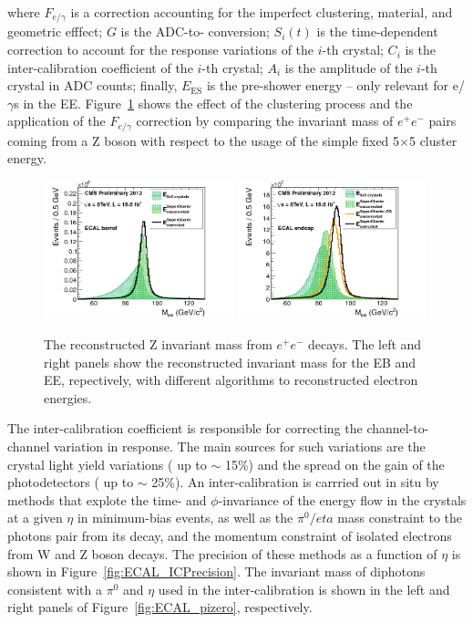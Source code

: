 where $F_{e/\gamma}$ is a correction accounting for the imperfect
clustering, material, and geometric efffect; $G$ is the ADC-to-\GeV
conversion; $S_{i}(t)$ is the time-dependent correction to account for
the response variations of the $i$-th crystal; $C_{i}$ is the
inter-calibration coefficient of the $i$-th crystal; $A_{i}$ is the
amplitude of the $i$-th crystal in ADC counts; finally,
$E_{\mathrm{ES}}$ is the pre-shower energy -- only relevant for
e/$\gamma$s in the EE. Figure~\ref{fig:ECAL_clusterE} shows the effect
of the clustering process and the application of the $F_{e/\gamma}$
correction by comparing the invariant mass of $e^{+}e^{-}$ pairs
coming from a Z boson with respect to the usage of the simple fixed
5$\times$5 cluster energy.

\begin{figure}
 \centering
\includegraphics[width=0.49\textwidth]{CMS_DetectorFigures/E_corr-EB.png}
\includegraphics[width=0.49\textwidth]{CMS_DetectorFigures/E_corr-EE.png}
\caption{The reconstructed Z invariant mass from $e^{+}e^{-}$
  decays. The left and right panels show the reconstructed invariant mass for
  the EB and EE, repectively, with different algorithms to reconstructed electron energies.\label{fig:ECAL_clusterE}}
\end{figure}

The inter-calibration coefficient is responsible for correcting the
channel-to-channel variation in response. The main sources for such
variations are the crystal light yield variations ( up to $\sim$ 15\%)
and the spread on the gain of the photodetectors ( up to $\sim$
25\%). An inter-calibration is carrried out in situ by methods that
explote the time- and $\phi$-invariance of the energy flow in the
crystals at a given $\eta$ in minimum-bias events, as well as the
$\pi^{0}/eta$ mass constraint to the photons pair from its decay, and
the momentum constraint of isolated electrons from W and Z boson
decays. The precision of these methods as a function of $\eta$ is
shown in Figure~\ref{fig:ECAL_ICPrecision}. The invariant mass of
diphotons consistent with a $\pi^{0}$ and $\eta$ used in the
inter-calibration is shown in the left and right panels of
Figure~\ref{fig:ECAL_pizero}, respectively.

